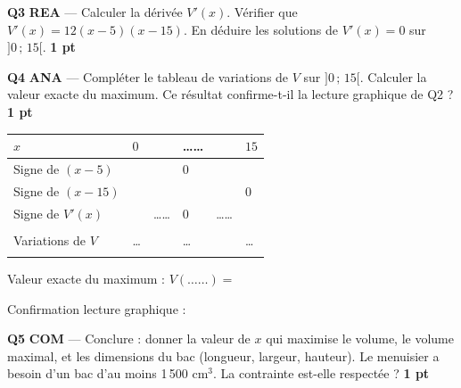 \documentclass[a4paper,11pt]{article}
\newcommand{\pts}[1]{\hfill\textcolor{gris}{\small\textbf{#1}}}
\newcommand{\comp}[1]{\colorbox{blue!10}{\scriptsize\textbf{#1}}}
\begin{document}
\textbf{Q3} \comp{REA} — Calculer la dérivée $V'(x)$. Vérifier que $V'(x) = 12(x - 5)(x - 15)$. En déduire les solutions de $V'(x) = 0$ sur $]0\,;\,15[$. \pts{1 pt}

\begin{reponsebox}[3.5cm]
\dotfill

\dotfill

\dotfill

\dotfill
\end{reponsebox}

\textbf{Q4} \comp{ANA} — Compléter le tableau de variations de $V$ sur $]0\,;\,15[$. Calculer la valeur exacte du maximum. Ce résultat confirme-t-il la lecture graphique de Q2 ? \pts{1 pt}

\begin{center}
\renewcommand{\arraystretch}{1.6}
\begin{tabular}{|>{\centering\arraybackslash}m{2.5cm}|>{\centering\arraybackslash}m{1.2cm}|>{\centering\arraybackslash}m{1.8cm}|>{\centering\arraybackslash}m{1.2cm}|>{\centering\arraybackslash}m{1.8cm}|>{\centering\arraybackslash}m{1.2cm}|}
\hline
$x$ & $0$ & & \ldots\ldots & & $15$ \\
\hline
Signe de $(x - 5)$ & & & $0$ & & \\
\hline
Signe de $(x - 15)$ & & & & & $0$ \\
\hline
Signe de $V'(x)$ & & \ldots\ldots & $0$ & \ldots\ldots & \\
\hline
& & & & & \\[6pt]
Variations de $V$ & \ldots & & \ldots & & \ldots \\[6pt]
& & & & & \\
\hline
\end{tabular}
\renewcommand{\arraystretch}{1}
\end{center}

\vspace{4pt}
Valeur exacte du maximum : $V(\ldots\ldots) = $ \dotfill

\vspace{4pt}
Confirmation lecture graphique : \dotfill

\textbf{Q5} \comp{COM} — Conclure : donner la valeur de $x$ qui maximise le volume, le volume maximal, et les dimensions du bac (longueur, largeur, hauteur). Le menuisier a besoin d'un bac d'au moins 1\,500 cm$^3$. La contrainte est-elle respectée ? \pts{1 pt}

\begin{reponsebox}[4cm]
\dotfill

\dotfill

\dotfill

\dotfill

\dotfill
\end{reponsebox}
\end{document}
